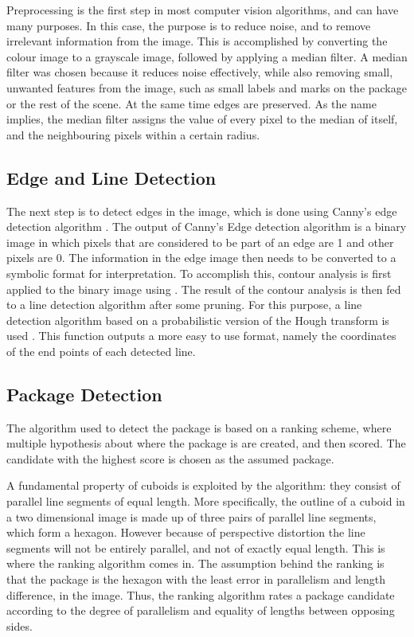 Preprocessing is the first step in most computer vision algorithms, and can have many purposes. 
In this case, the purpose is to reduce noise, and to remove irrelevant information from the image.
This is accomplished by converting the colour image to a grayscale image, followed by applying a median filter. 
A median filter was chosen because it reduces noise effectively, while also removing small, unwanted features from the image, such as small labels and marks on the package or the rest of the scene.
At the same time edges are preserved.
As the name implies, the median filter assigns the value of every pixel to the median of itself, and the neighbouring pixels within a certain radius. %

\subsection{Edge and Line Detection} %
The next step is to detect edges in the image, which is done using Canny's edge detection algorithm \cite{canny}. %
The output of Canny's Edge detection algorithm is a binary image in which pixels that are considered to be part of an edge are 1 and other pixels are 0.
The information in the edge image then needs to be converted to a symbolic format for interpretation.
To accomplish this, contour analysis is first applied to the binary image using \cite{suzuki}. %
The result of the contour analysis is then fed to a line detection algorithm after some pruning.
For this purpose, a line detection algorithm based on a probabilistic version of the Hough transform is used \cite{houghp}. %
This function outputs a more easy to use format, namely the coordinates of the end points of each detected line.

\subsection{Package Detection}

The algorithm used to detect the package is based on a ranking scheme, where multiple hypothesis about where the package is are created, and then scored. 
The candidate with the highest score is chosen as the assumed package. 

A fundamental property of cuboids is exploited by the algorithm: they consist of parallel line segments of equal length. 
More specifically, the outline of a cuboid in a two dimensional image is made up of three pairs of parallel line segments, which form a hexagon. 
However because of perspective distortion the line segments will not be entirely parallel, and not  of exactly equal length.
This is where the ranking algorithm comes in.
The assumption behind the ranking is that the package is the hexagon with the least error in parallelism and length difference, in the image.
Thus, the ranking algorithm rates a package candidate according to the degree of parallelism and equality of lengths between opposing sides.

